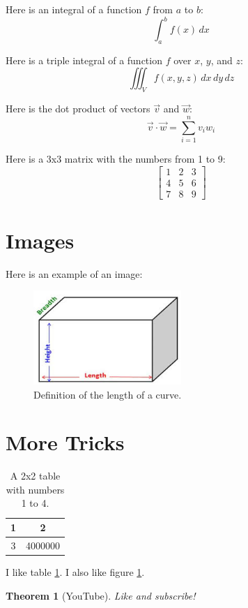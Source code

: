\documentclass{article}
\newtheorem{theorem}{Theorem}[section]
\begin{document}
Here is an integral of a function \( f \) from \( a \) to \( b \):
\[
    \int_{a}^{b} f(x) \, dx
\]

Here is a triple integral of a function \( f \) over \( x \), \( y \), and \( z \):
\[
    \iiint_V f(x, y, z) \, dx \, dy \, dz
\]

Here is the dot product of vectors \( \vec{v} \) and \( \vec{w} \):
\[
    \vec{v} \cdot \vec{w} = \sum_{i=1}^{n} v_i w_i
\]

Here is a 3x3 matrix with the numbers from 1 to 9:
\[
    \begin{bmatrix}
        1 & 2 & 3 \\
        4 & 5 & 6 \\
        7 & 8 & 9
    \end{bmatrix}
\]

\section{Images}

Here is an example of an image:

\begin{figure}[H]
    \centering
    \includegraphics[width=0.5\textwidth]{images/length.jpeg}
    \caption{Definition of the length of a curve.}
    \label{fig:length}
\end{figure}
\newpage
\section{More Tricks}

\begin{table}[H]
    \centering
    \begin{tabular}{|c|c|}
        \hline
        1 & 2       \\ \hline
        3 & 4000000 \\ \hline
    \end{tabular}
    \caption{A 2x2 table with numbers 1 to 4.}
    \label{tab:numbers}
\end{table}

I like table \ref{tab:numbers}. I also like figure \ref{fig:length}.

\begin{theorem}[YouTube]
    Like and subscribe!
\end{theorem}
\end{document}

